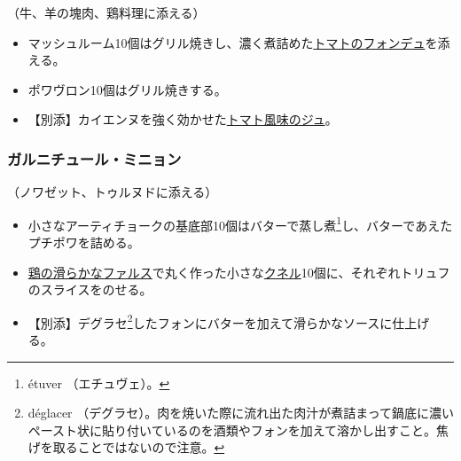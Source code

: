 \begin{recette}


（牛、羊の塊肉、鶏料理に添える）

\begin{itemize}
\item
  マッシュルーム10個はグリル焼きし、濃く煮詰めた\protect\hyperlink{portugaise}{トマトのフォンデュ}を添える。
\item
  ポワヴロン10個はグリル焼きする。
\item
  【別添】カイエンヌを強く効かせた\protect\hyperlink{jus-lie-tomate}{トマト風味のジュ}。
\end{itemize}

\atoaki{}

\hypertarget{garniture-mignon}{%
\subsubsection{ガルニチュール・ミニョン}\label{garniture-mignon}}



（ノワゼット、トゥルヌドに添える）

\begin{itemize}
\item
  小さなアーティチョークの基底部10個はバターで蒸し煮\footnote{étuver
    （エチュヴェ）。}し、バターであえたプチポワを詰める。
\item
  \protect\hyperlink{farce-b}{鶏の滑らかなファルス}で丸く作った小さな\protect\hyperlink{quenelles}{クネル}10個に、それぞれトリュフのスライスをのせる。
\item
  【別添】デグラセ\footnote{déglacer
    （デグラセ）。肉を焼いた際に流れ出た肉汁が煮詰まって鍋底に濃いペースト状に貼り付いているのを酒類やフォンを加えて溶かし出すこと。焦げを取ることではないので注意。}したフォンにバターを加えて滑らかなソースに仕上げる。
\end{itemize}

\atoaki{}

\hypertarget{garniture-a-la-milanaise}{%
}
\end{recette}
